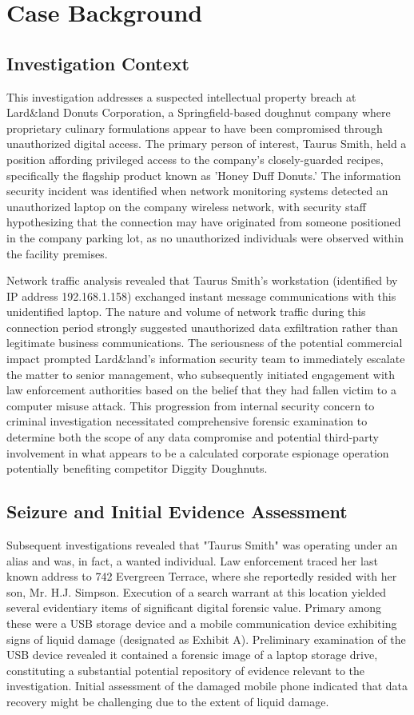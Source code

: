 \chapter{Case Background}

\section{Investigation Context}
This investigation addresses a suspected intellectual property breach at Lard\&land Donuts Corporation, a Springfield-based doughnut company where proprietary culinary formulations appear to have been compromised through unauthorized digital access. The primary person of interest, Taurus Smith, held a position affording privileged access to the company's closely-guarded recipes, specifically the flagship product known as 'Honey Duff Donuts.' The information security incident was identified when network monitoring systems detected an unauthorized laptop on the company wireless network, with security staff hypothesizing that the connection may have originated from someone positioned in the company parking lot, as no unauthorized individuals were observed within the facility premises.

Network traffic analysis revealed that Taurus Smith's workstation (identified by IP address 192.168.1.158) exchanged instant message communications with this unidentified laptop. The nature and volume of network traffic during this connection period strongly suggested unauthorized data exfiltration rather than legitimate business communications. The seriousness of the potential commercial impact prompted Lard\&land's information security team to immediately escalate the matter to senior management, who subsequently initiated engagement with law enforcement authorities based on the belief that they had fallen victim to a computer misuse attack. This progression from internal security concern to criminal investigation necessitated comprehensive forensic examination to determine both the scope of any data compromise and potential third-party involvement in what appears to be a calculated corporate espionage operation potentially benefiting competitor Diggity Doughnuts.

\section{Seizure and Initial Evidence Assessment}
Subsequent investigations revealed that "Taurus Smith" was operating under an alias and was, in fact, a wanted individual. Law enforcement traced her last known address to 742 Evergreen Terrace, where she reportedly resided with her son, Mr. H.J. Simpson. Execution of a search warrant at this location yielded several evidentiary items of significant digital forensic value. Primary among these were a USB storage device and a mobile communication device exhibiting signs of liquid damage (designated as Exhibit A). Preliminary examination of the USB device revealed it contained a forensic image of a laptop storage drive, constituting a substantial potential repository of evidence relevant to the investigation. Initial assessment of the damaged mobile phone indicated that data recovery might be challenging due to the extent of liquid damage.

